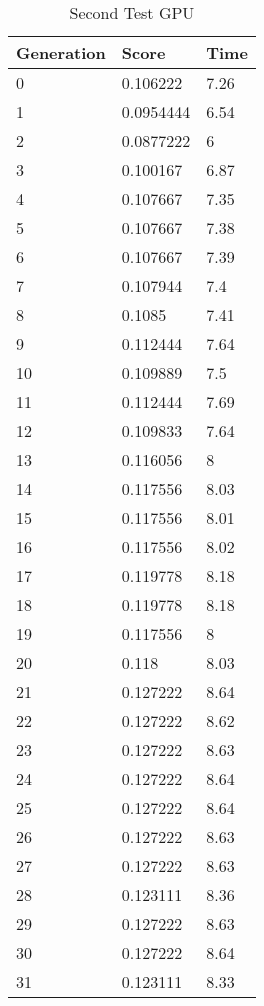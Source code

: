 \begin{table}
\caption{Second Test GPU}
\centering
 \begin{tabular}{ | l | l | l |}
    \hline
    Generation & Score & Time \\ \hline
     0 & 0.106222 & 7.26 \\ \hline
     1 & 0.0954444 & 6.54 \\ \hline
     2 & 0.0877222 & 6 \\ \hline
     3 & 0.100167 & 6.87 \\ \hline
     4 & 0.107667 & 7.35 \\ \hline
     5 & 0.107667 & 7.38 \\ \hline
     6 & 0.107667 & 7.39 \\ \hline
     7 & 0.107944 & 7.4 \\ \hline
     8 & 0.1085 & 7.41 \\ \hline
     9 & 0.112444 & 7.64 \\ \hline
     10 & 0.109889 & 7.5 \\ \hline
     11 & 0.112444 & 7.69 \\ \hline
     12 & 0.109833 & 7.64 \\ \hline
     13 & 0.116056 & 8 \\ \hline
     14 & 0.117556 & 8.03 \\ \hline
     15 & 0.117556 & 8.01 \\ \hline
     16 & 0.117556 & 8.02 \\ \hline
     17 & 0.119778 & 8.18 \\ \hline
     18 & 0.119778 & 8.18 \\ \hline
     19 & 0.117556 & 8 \\ \hline
     20 & 0.118 & 8.03 \\ \hline
     21 & 0.127222 & 8.64 \\ \hline
     22 & 0.127222 & 8.62 \\ \hline
     23 & 0.127222 & 8.63 \\ \hline
     24 & 0.127222 & 8.64 \\ \hline
     25 & 0.127222 & 8.64 \\ \hline
     26 & 0.127222 & 8.63 \\ \hline
     27 & 0.127222 & 8.63 \\ \hline
     28 & 0.123111 & 8.36 \\ \hline
     29 & 0.127222 & 8.63 \\ \hline
     30 & 0.127222 & 8.64 \\ \hline
     31 & 0.123111 & 8.33 \\ \hline

\end{tabular}
\end{table}

